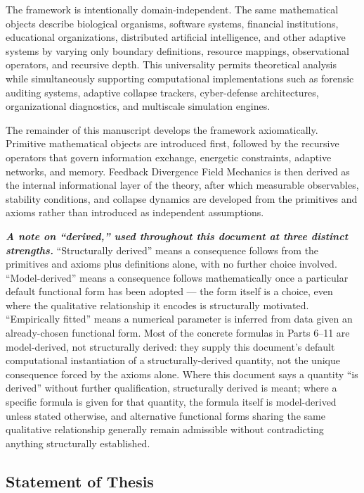 \documentclass[
]{article}
\begin{document}
The framework is intentionally domain-independent. The same mathematical
objects describe biological organisms, software systems, financial
institutions, educational organizations, distributed artificial
intelligence, and other adaptive systems by varying only boundary
definitions, resource mappings, observational operators, and recursive
depth. This universality permits theoretical analysis while
simultaneously supporting computational implementations such as forensic
auditing systems, adaptive collapse trackers, cyber-defense
architectures, organizational diagnostics, and multiscale simulation
engines.

The remainder of this manuscript develops the framework axiomatically.
Primitive mathematical objects are introduced first, followed by the
recursive operators that govern information exchange, energetic
constraints, adaptive networks, and memory. Feedback Divergence Field
Mechanics is then derived as the internal informational layer of the
theory, after which measurable observables, stability conditions, and
collapse dynamics are developed from the primitives and axioms rather
than introduced as independent assumptions.

\emph{\textbf{A note on ``derived,'' used throughout this document at
three distinct strengths.}} ``Structurally derived'' means a consequence
follows from the primitives and axioms plus definitions alone, with no
further choice involved. ``Model-derived'' means a consequence follows
mathematically once a particular default functional form has been
adopted --- the form itself is a choice, even where the qualitative
relationship it encodes is structurally motivated. ``Empirically
fitted'' means a numerical parameter is inferred from data given an
already-chosen functional form. Most of the concrete formulas in Parts
6--11 are model-derived, not structurally derived: they supply this
document's default computational instantiation of a structurally-derived
quantity, not the unique consequence forced by the axioms alone. Where
this document says a quantity ``is derived'' without further
qualification, structurally derived is meant; where a specific formula
is given for that quantity, the formula itself is model-derived unless
stated otherwise, and alternative functional forms sharing the same
qualitative relationship generally remain admissible without
contradicting anything structurally established.

\hypertarget{statement-of-thesis}{%
\subsection{Statement of Thesis}\label{statement-of-thesis}}
\end{document}
